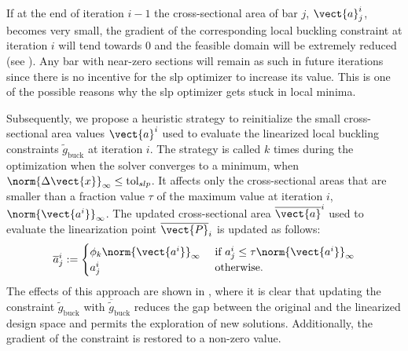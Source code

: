 If at the end of iteration $i-1$ the cross-sectional area of bar $j$, $\vect{a}^i_{j}$, becomes very small, the gradient of the corresponding local buckling constraint at iteration $i$ will tend towards 0 and the feasible domain will be extremely reduced (see ). Any bar with near-zero sections will remain as such in future iterations since there is no incentive for the \gls{slp} optimizer to increase its value. This is one of the possible reasons why the \gls{slp} optimizer gets stuck in local minima.

Subsequently, we propose a heuristic strategy to reinitialize the small cross-sectional area values $\vect{a}^{i}$ used to evaluate the linearized local buckling constraints $\tilde{g}_{\text{buck}}$ at iteration $i$. The strategy is called $k$ times during the optimization when the solver converges to a minimum, \ie when $ \norm{\Delta \vect{x}}_\infty \leq \text{tol}_{slp} $. It affects only the cross-sectional areas that are smaller than a fraction value $\tau$ of the maximum value at iteration $i$, $\norm{\vect{a^i}}_\infty$. The updated cross-sectional area $\overline{\vect{a}}^i$ used to evaluate the linearization point $\overline{\vect{P}}_{i}$ is updated as follows:
\begin{equation}
    \overline{a}^i_{j}:=
    \begin{cases}
        \phi_k \norm{\vect{a^i}}_\infty & \text{ if } a^i_{j} \leq \tau \norm{\vect{a^i}}_\infty\\
        a^i_{j} & \text { otherwise.}  
    \end{cases}
    \label{eq:04_reinit}
\end{equation}
The effects of this approach are shown in , where it is clear that updating the constraint $\tilde{g}_{\text{buck}}$ with $\overline{\tilde{g}}_{\text{buck}}$ reduces the gap between the original and the linearized design space and permits the exploration of new solutions. Additionally, the gradient of the constraint is restored to a non-zero value.


